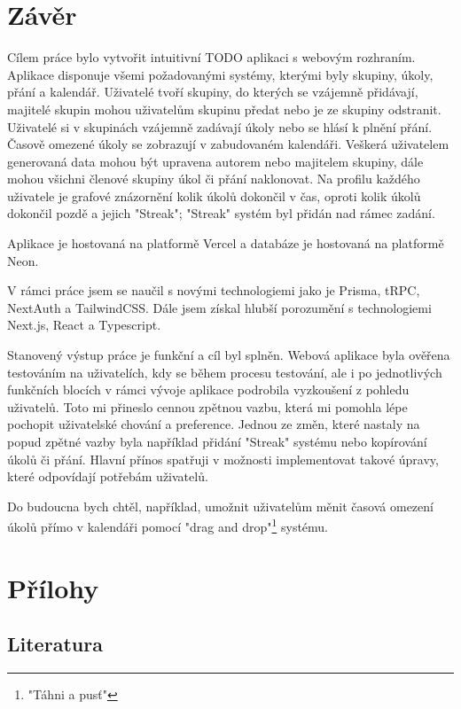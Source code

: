 \documentclass[a4paper,12pt]{report}
\begin{document}
\chapter{Závěr}
Cílem práce bylo vytvořit intuitivní TODO aplikaci s webovým rozhraním. Aplikace disponuje všemi požadovanými systémy, kterými byly skupiny, úkoly, přání a kalendář. Uživatelé tvoří skupiny, do kterých se vzájemně přidávají, majitelé skupin mohou uživatelům skupinu předat nebo je ze skupiny odstranit. Uživatelé si v skupinách vzájemně zadávají úkoly nebo se hlásí k plnění přání. Časově omezené úkoly se zobrazují v zabudovaném kalendáři. Veškerá uživatelem generovaná data mohou být upravena autorem nebo majitelem skupiny, dále mohou všichni členové skupiny úkol či přání naklonovat. Na profilu každého uživatele je grafové znázornění kolik úkolů dokončil v čas, oproti kolik úkolů dokončil pozdě a jejich "Streak"; "Streak" systém byl přidán nad rámec zadání.

Aplikace je hostovaná na platformě Vercel\cite{vercel} a databáze je hostovaná na platformě Neon\cite{neon}.

V rámci práce jsem se naučil s novými technologiemi jako je Prisma, tRPC, NextAuth a TailwindCSS. Dále jsem získal hlubší porozumění s technologiemi Next.js, React a Typescript.

Stanovený výstup práce je funkční a cíl byl splněn. Webová aplikace byla ověřena testováním na uživatelích, kdy se během procesu testování, ale i po jednotlivých funkčních blocích v rámci vývoje aplikace podrobila vyzkoušení z pohledu uživatelů. Toto mi přineslo cennou zpětnou vazbu, která mi pomohla lépe pochopit uživatelské chování a preference. Jednou ze změn, které nastaly na popud zpětné vazby byla například přidání "Streak" systému nebo kopírování úkolů či přání. Hlavní přínos spatřuji v možnosti implementovat takové úpravy, které odpovídají potřebám uživatelů. 

Do budoucna bych chtěl, například, umožnit uživatelům měnit časová omezení úkolů přímo v kalendáři pomocí "drag and drop"\footnote{"Táhni a pusť"} systému.
\chapter{Přílohy}


\let\clearpage\relax
\section{Literatura}
\printbibliography[heading=none]
\pagebreak
\end{document}
